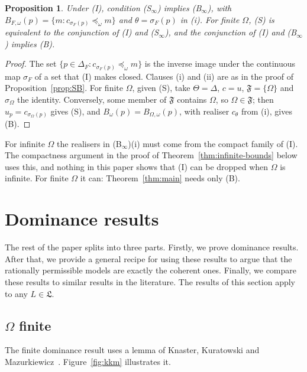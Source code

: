 \documentclass[11pt]{article}
\newtheorem{proposition}[theorem]{Proposition}
\theoremstyle{definition}
\theoremstyle{remark}
\newcommand{\F}{\mathfrak F}
\begin{document}
\begin{proposition}\label{prop:SBinfty}
Under (I), condition (S$_\infty$) implies (B$_\infty$), with $B_{F,\omega}(p)=\{m:c_{\sigma_F(p)}\preceq_\omega m\}$ and $\theta=\sigma_F(p)$ in (i). For finite $\Omega$, (S) is equivalent to the conjunction of (I) and (S$_\infty$), and the conjunction of (I) and (B$_\infty$) implies (B).
\end{proposition}
\begin{proof}
The set $\{p\in\Delta_F:c_{\sigma_F(p)}\preceq_\omega m\}$ is the inverse image under the continuous map $\sigma_F$ of a set that (I) makes closed. Clauses (i) and (ii) are as in the proof of Proposition~\ref{prop:SB}. For finite $\Omega$, given (S), take $\Theta=\Delta$, $c=u$, $\F=\{\Omega\}$ and $\sigma_\Omega$ the identity. Conversely, some member of $\F$ contains $\Omega$, so $\Omega\in\F$; then $u_p=c_{\sigma_\Omega(p)}$ gives (S), and $B_\omega(p)=B_{\Omega,\omega}(p)$, with realiser $c_\theta$ from (i), gives (B).
\end{proof}
For infinite $\Omega$ the realisers in (B$_\infty$)(i) must come from the compact family of (I). The compactness argument in the proof of Theorem~\ref{thm:infinite-bounds} below uses this, and nothing in this paper shows that (I) can be dropped when $\Omega$ is infinite. For finite $\Omega$ it can: Theorem~\ref{thm:main} needs only (B).

\section{Dominance results}\label{sec:results}
The rest of the paper splits into three parts. Firstly, we prove dominance results. After that, we provide a general recipe for using these results to argue that the rationally permissible models are exactly the coherent ones. Finally, we compare these results to similar results in the literature. The results of this section apply to any $L\in\mathfrak L$.

\subsection{\texorpdfstring{$\Omega$}{Omega} finite}\label{sec:kkm}
The finite dominance result uses a lemma of Knaster, Kuratowski and Mazurkiewicz~\cite{KKM}. Figure~\ref{fig:kkm} illustrates it.
\end{document}
